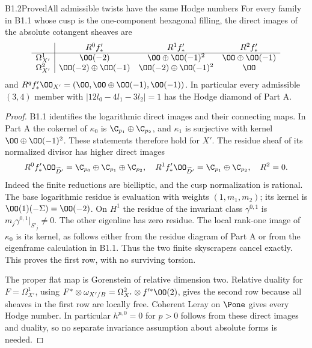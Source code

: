 \begin{claim}{B1.2}{Proved}{All admissible twists have the same Hodge numbers}
For every family in B1.1 whose cusp is the one-component hexagonal filling,
the direct images of the absolute cotangent sheaves are
\[
\begin{array}{c|ccc}
 &R^0f'_*&R^1f'_*&R^2f'_*\\\hline
\Omega^1_{X'}&\OO(-2)&\OO\oplus\OO(-1)^2&\OO\oplus\OO(-1)\\
\Omega^2_{X'}&\OO(-2)\oplus\OO(-1)&\OO(-2)\oplus\OO(-1)^2&\OO
\end{array}
\]
and $R^qf'_*\OO_{X'}=(\OO,\OO\oplus\OO(-1),\OO(-1))$.
In particular every admissible $(3,4)$ member with
$|12l_0-4l_1-3l_2|=1$ has the Hodge diamond of Part A.
\end{claim}
\begin{proof}
B1.1 identifies the logarithmic direct images and their connecting maps.
In Part A the cokernel of $\kappa_0$ is
$\C_{p_1}\oplus\C_{p_2}$, and $\kappa_1$ is surjective with kernel
$\OO\oplus\OO(-1)^2$. These statements therefore hold for $X'$.
The residue sheaf of its normalized divisor has higher direct images
\[
R^0f'_*\OO_{\widetilde D'}=\C_{p_0}\oplus\C_{p_1}\oplus\C_{p_2},
\quad R^1f'_*\OO_{\widetilde D'}=\C_{p_1}\oplus\C_{p_2},
\quad R^2=0.
\]
Indeed the finite reductions are bielliptic, and the cusp normalization
is rational. The base logarithmic residue is evaluation with weights
$(1,m_1,m_2)$; its kernel is $\OO(1)(-\Sigma)=\OO(-2)$.
On $H^1$ the residue of the invariant class $\gamma^{0,1}$ is
$m_j\gamma^{0,1}|_{S'_j}\ne0$. The other eigenline has zero residue.
The local rank-one image of $\kappa_0$ is its kernel, as follows either
from the residue diagram of Part A or from the eigenframe calculation
in B1.1. Thus the two finite skyscrapers cancel exactly. This proves
the first row, with no surviving torsion.

The proper flat map is Gorenstein of relative dimension two. Relative
duality for $F=\Omega^1_{X'}$, using
$F^*\otimes\omega_{X'/B}=\Omega^2_{X'}\otimes f'^*\OO(2)$,
gives the second row because all sheaves in the first row are locally
free. Coherent Leray on $\Pone$ gives every Hodge number. In particular
$h^{p,0}=0$ for $p>0$ follows from these direct images and duality,
so no separate invariance assumption about absolute forms is needed.
\end{proof}
